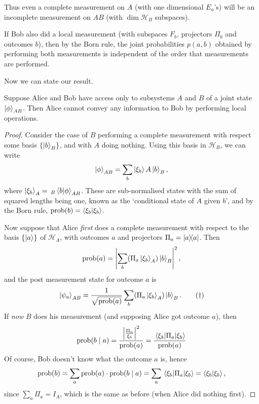 \documentclass[a4paper]{article}
\begin{document}
Thus even a complete measurement on $A$ (with one dimensional $E_a$'s) will be an incomplete measurement on $AB$ (with $\operatorname{dim} \mathcal{H}_B$ subspaces).

If Bob also did a local measurement (with subspaces $F_b$, projectors $\Pi_b$ and outcomes $b$), then by the Born rule, the joint probabilities $p(a, b)$ obtained by performing both measurements is independent of the order that measurements are performed.

Now we can state our result.

\begin{theorem}
Suppose Alice and Bob have access only to subsystems $A$ and $B$ of a joint state $\ket{\phi}_{AB}$. Then Alice cannot convey any information to Bob by performing local operations.	
\end{theorem}
\begin{proof}
	Consider the case of $B$ performing a complete measurement with respect some basis $\{\ket{b}_B\}$, and with $A$ doing nothing.
	Using this basis in $\mathcal{H}_B$, we can write
	$$
	\ket{\phi}_{AB} = \sum_b \ket{\xi_b}A \ket{b}_B,
	$$
	where $\ket{\xi_b}_A = \,_B \ip{b}{\phi}_{AB}$.
	These are sub-normalised states with the sum of squared lengths being one, known as the `conditional state of $A$ given $b$',
	and by the Born rule, $\operatorname{prob}(b) = \ip{\xi_b}{\xi_b}$.

	Now suppose that Alice \emph{first} does a complete measurement with respect to the basis $\{\ket{a}\}$ of $\mathcal{H}_A$, with outcomes $a$ and projectors $\Pi_a = \dyad{a}$. Then 
	$$
	\operatorname{prob}(a) = \left|\sum_b (\Pi_a\ket{\xi_b}_A) \ket{b}_B\right|^2,
	$$
	and the post measurement state for outcome $a$ is
	\begin{equation}\label{eq:poststate}
		\ket{\psi_a}_{AB} = \frac{1}{\sqrt{\operatorname{prob}(a)}} \sum_b (\Pi_a \ket{\xi_b}_A) \ket{b}_B.\tag{$\dagger$}
	\end{equation}
	If \emph{now} $B$ does his measurement (and supposing Alice got outcome $a$), then
	$$
	\operatorname{prob}(b \mid a) = \frac{\left|\frac{\Pi_a}{\xi_b}\right|^2}{\operatorname{prob}(a)} = \frac{\ev{\Pi_a}{\xi_b}}{\operatorname{prob}(a)}
	$$
	Of course, Bob doesn't know what the outcome $a$ is, hence
	$$
	\operatorname{prob}(b) = \sum_a \operatorname{prob}(a) \cdot \operatorname{prob}(b \mid a)  = \sum_a \ev{\Pi_a}{\xi_b} = \ip{\xi_b}{\xi_b},
	$$
	since $\sum_a \Pi_a = I_A$, which is the same as before (when Alice did nothing first).
\end{proof}
\end{document}

